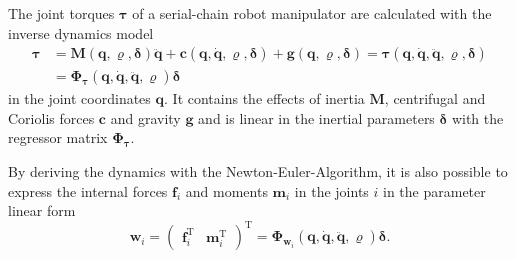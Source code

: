 \documentclass{svproc}
\newcommand{\bm}[1]{\boldsymbol{#1}}
\newcommand{\transp}[0]{{\mathrm{T}}}
\begin{document}
The joint torques $\bm{\tau}$ of a serial-chain robot manipulator are calculated with the inverse dynamics model
%
\begin{align}
\bm{\tau} 
&= 
\bm{M}(\bm{q},\bm{\varrho},\bm{\delta}) \ddot{\bm{q}}
+ \bm{c}(\bm{q},\dot{\bm{q}},\bm{\varrho},\bm{\delta})
+ \bm{g}(\bm{q},\bm{\varrho},\bm{\delta}) \label{equ:invdyn_normal} 
= \bm{\tau}(\bm{q},\dot{\bm{q}},\ddot{\bm{q}},\bm{\varrho},\bm{\delta})\\
&=
\bm{\Phi}_{\bm{\tau}}(\bm{q},\dot{\bm{q}},\ddot{\bm{q}},\bm{\varrho}) \bm{\delta}
\label{equ:invdyn_reg}
\end{align}
%
in the joint coordinates $\bm{q}$.
It contains the effects of inertia $\bm{M}$, centrifugal and Coriolis forces $\bm{c}$ and gravity $\bm{g}$ and is linear in the inertial parameters $\bm{\delta}$ with the regressor matrix $\bm{\Phi}_{\bm{\tau}}$.

By deriving the dynamics with the Newton-Euler-Algorithm, it is also possible to express the internal forces $\bm{f}_i$ and moments $\bm{m}_i$ in the joints $i$ in the parameter linear form
\begin{equation}
\bm{w}_i = 
\begin{pmatrix} \bm{f}_i^\transp & \bm{m}_i^\transp\end{pmatrix}^\transp
=
\bm{\Phi}_{\bm{w}_i}(\bm{q},\dot{\bm{q}},\ddot{\bm{q}},\bm{\varrho}) \bm{\delta}.
\label{equ:joint_wrench}
\end{equation}
\end{document}
